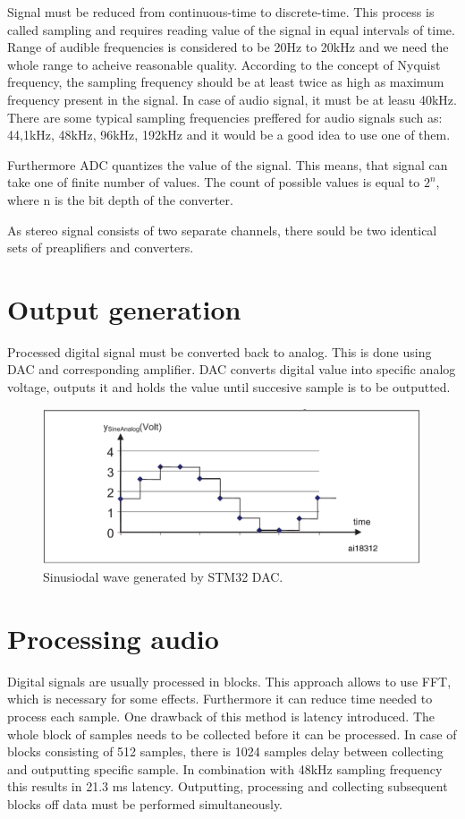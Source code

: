 \documentclass[a4paper,twoside,12pt]{book}
\begin{document}
Signal must be reduced from continuous-time to discrete-time.
This process is called sampling and requires reading value of the signal in equal intervals of time.
Range of audible frequencies is considered to be 20Hz to 20kHz
and we need the whole range to acheive reasonable quality.
According to the concept of Nyquist frequency, the sampling frequency should be at least
twice as high as maximum frequency present in the signal.
In case of audio signal, it must be at leasu 40kHz.
There are some typical sampling frequencies preffered for audio signals such as: 44,1kHz, 48kHz,
96kHz, 192kHz and it would be a good idea to use one of them.

Furthermore ADC quantizes the value of the signal.
This means, that signal can take one of finite number of values.
The count of possible values is equal to \(2^n\), where n is the bit depth of the converter.

As stereo signal consists of two separate channels,
there sould be two identical sets of preaplifiers and converters.

\section{Output generation}
Processed digital signal must be converted back to analog.
This is done using DAC and corresponding amplifier.
DAC converts digital value into specific analog voltage,
outputs it and holds the value until succesive sample is to be outputted.
\cite{ST:DAC2}

\begin{figure}[H]
    \centering
    \includegraphics[width=\textwidth]{images/DAC_sine}
    \caption{Sinusiodal wave generated by STM32 DAC.}
    \label{fig:sine}
\end{figure}

\section{Processing audio}
Digital signals are usually processed in blocks.
This approach allows to use FFT, which is necessary for some effects.
Furthermore it can reduce time needed to process each sample.
One drawback of this method is latency introduced.
The whole block of samples needs to be collected before it can be processed.
In case of blocks consisting of 512 samples,
there is 1024 samples delay between collecting and outputting specific sample.
In combination with 48kHz sampling frequency this results in 21.3 ms latency.
Outputting, processing and collecting subsequent blocks off data
must be performed simultaneously.
\end{document}
